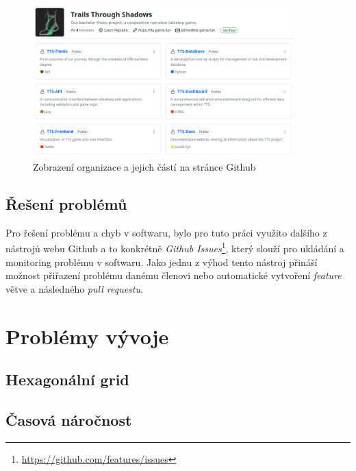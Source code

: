 \begin{figure}[H]
    \centering
    \includegraphics[width=0.9\textwidth]{../../shared/figures/gitOrg}
    \caption{Zobrazení organizace a jejich částí na stránce Github}
    \label{fig:git_organization}
\end{figure}

\subsection{Řešení problémů}
\label{subsec:implementation-collaboration-problems}
Pro řešení problému a chyb v softwaru, bylo pro tuto práci využito dalšího z nástrojů webu Github a to konkrétně \textit{Github Issues}\footnote{\href{https://github.com/features/issues}{https://github.com/features/issues}}, který slouží pro ukládání a monitoring problému v softwaru. Jako jednu z výhod tento nástroj přináší možnost přiřazení problému danému členovi nebo automatické vytvoření \textit{feature} větve a následného \textit{pull requestu}.

\section{Problémy vývoje}
\label{sec:implementation-problems}

\subsection*{Hexagonální grid}
\label{subsec:implementation-problems-hexagon}

\subsection*{Časová náročnost}
\label{subsec:implementation-problems-time}

%

\endinput